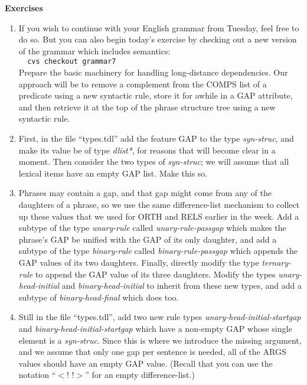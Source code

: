 \documentclass[10pt]{article}
\begin{document}
\medskip
\textbf{Exercises}
\begin{enumerate}
\item If you wish to continue with your English grammar from Tuesday, feel
free to do so.  But you can also begin today's exercise by checking out a
new version of the grammar which includes semantics:\\

        \verb|  cvs checkout grammar7|\\

Prepare the basic machinery for handling long-distance dependencies.
Our approach will be to remove a complement from the COMPS list
of a predicate using a new syntactic rule, store it for awhile in a GAP 
attribute, and then retrieve it at the top of the phrase structure tree 
using a new syntactic rule.  

\item First, in the file ``types.tdl'' add the feature GAP to the type {\it
syn-struc}, and make its value be of type {\it *dlist*}, for reasons that will
become clear in a moment.  Then consider the two types of {\it syn-struc}; we
will assume that all lexical items have an empty GAP list.  Make this so.

\item Phrases may contain a gap, and that gap might come from any of the
daughters of a phrase, so we use the same difference-list mechanism to collect
up these values that we used for ORTH and RELS earlier in the week.  Add a
subtype of the type {\it unary-rule} called {\it unary-rule-passgap} which
makes the phrase's GAP be unified with the GAP of its only daughter, and add a
subtype of the type {\it binary-rule} called {\it binary-rule-passgap} which
appends the GAP values of its two daughters.  Finally, directly modify the
type {\it ternary-rule} to append the GAP value of its three daughters.
Modify the types {\it unary-head-initial} and {\it binary-head-initial} to
inherit from these new types, and add a subtype of {\it binary-head-final}
which does too.

\item Still in the file ``types.tdl'', add two new rule types {\it
unary-head-initial-startgap} and {\it binary-head-initial-startgap} which have
a non-empty GAP whose single element is a {\it syn-struc}.  Since this
is where we introduce the missing argument, and we assume that only one gap
per sentence is needed, all of the ARGS values should have an empty
GAP value.  (Recall that you can use the notation ``$<$! !$>$'' for an empty
difference-list.)


\end{enumerate}
\end{document}

